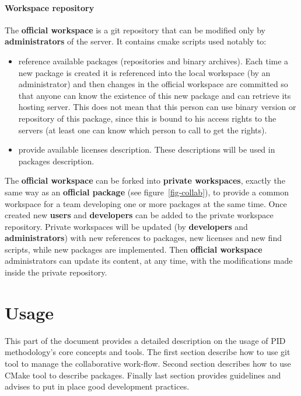 \documentclass[12pt,a4paper]{article}
\begin{document}
\subsection{Workspace repository}
\label{sec:workspaceRepository}

The \textbf{official workspace} is a git repository that can be modified only by \textbf{administrators} of the server. It contains cmake scripts used notably to:
\begin{itemize}
\item reference available packages (repositories and binary archives). Each time a new package is created it is referenced into the local workspace (by an administrator) and then changes in the official workspace are committed so that anyone can know the existence of this new package and can retrieve its hosting server. This does not mean that this person can use binary version or repository of this package, since this is bound to his access rights to the servers (at least one can know which person to call to get the rights).
\item provide available licenses description. These descriptions will be used in packages description.
\end{itemize}

The \textbf{official workspace} can be forked into \textbf{private workspaces}, exactly the same way as an \textbf{official package} (see figure~\ref{fig-collab}), to provide a common workspace for a team developing one or more packages at the same time. Once created new \textbf{users} and \textbf{developers} can be added to the private workspace repository. Private workspaces will be updated (by \textbf{developers} and \textbf{administrators}) with new references to packages, new licenses and new find scripts, while new packages are implemented. Then \textbf{official workspace} administrators can update its content, at any time, with the modifications made inside the private repository.

\pagebreak

\part{Usage}

This part of the document provides a detailed description on the usage of PID methodology's core concepts and tools. The first section describe how to use git tool to manage the collaborative work-flow. Second section describes how to use CMake tool to describe packages. Finally last section provides guidelines and advises to put in place good development practices.
\end{document}
